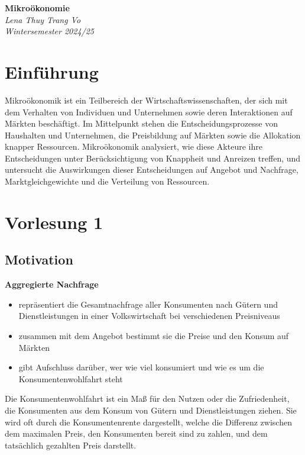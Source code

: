 \documentclass[a4paper, 10pt]{article}
\begin{document}
\begin{titlepage}
    \centering
    \vspace*{3cm}
    {\Huge \textbf{Mikroökonomie}}\\[1.5cm]
    {\large \textit{Lena Thuy Trang Vo}}\\[0.5cm]
    {\large \textit{Wintersemester 2024/25}}\\[2cm]

    \vfill
\end{titlepage}

\tableofcontents
\newpage

\section{Einführung}
Mikroökonomik ist ein Teilbereich der Wirtschaftswissenschaften, der sich mit dem Verhalten von Individuen und Unternehmen sowie deren Interaktionen auf Märkten beschäftigt. Im Mittelpunkt stehen die Entscheidungsprozesse von Haushalten und Unternehmen, die Preisbildung auf Märkten sowie die Allokation knapper Ressourcen. Mikroökonomik analysiert, wie diese Akteure ihre Entscheidungen unter Berücksichtigung von Knappheit und Anreizen treffen, und untersucht die Auswirkungen dieser Entscheidungen auf Angebot und Nachfrage, Marktgleichgewichte und die Verteilung von Ressourcen.


\section{Vorlesung 1}
\subsection{Motivation}

\textbf{Aggregierte Nachfrage}
\begin{itemize}
    \item repräsentiert die Gesamtnachfrage aller Konsumenten nach Gütern und Dienstleistungen in einer Volkswirtschaft bei verschiedenen Preisniveaus
    \item zusammen mit dem Angebot bestimmt sie die Preise und den Konsum auf Märkten
    \item gibt Aufschluss darüber, wer wie viel konsumiert und wie es um die Konsumentenwohlfahrt steht
\end{itemize}

\begin{definitionbox}
    Die Konsumentenwohlfahrt ist ein Maß für den Nutzen oder die Zufriedenheit, die Konsumenten aus dem Konsum von Gütern und Dienstleistungen ziehen. Sie wird oft durch die Konsumentenrente dargestellt, welche die Differenz zwischen dem maximalen Preis, den Konsumenten bereit sind zu zahlen, und dem tatsächlich gezahlten Preis darstellt.
\end{definitionbox}
\end{document}
